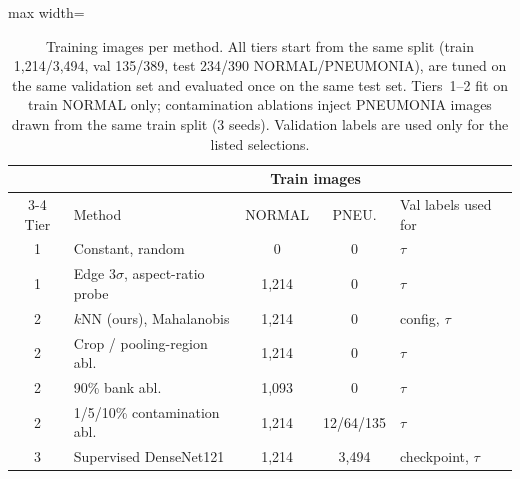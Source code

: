 \begin{table}[t]
\centering
\footnotesize
\setlength{\tabcolsep}{3.5pt}
\begin{adjustbox}{max width=\columnwidth}
\begin{tabular}{clccl}
\toprule
 & & \multicolumn{2}{c}{Train images} & \\
\cmidrule(lr){3-4}
Tier & Method & NORMAL & PNEU. & Val labels used for \\
\midrule
1 & Constant, random & 0 & 0 & $\tau$ \\
1 & Edge $3\sigma$, aspect-ratio probe & 1,214 & 0 & $\tau$ \\
2 & $k$NN (ours), Mahalanobis & 1,214 & 0 & config, $\tau$ \\
2 & Crop / pooling-region abl. & 1,214 & 0 & $\tau$ \\
2 & 90\% bank abl. & 1,093 & 0 & $\tau$ \\
2 & 1/5/10\% contamination abl. & 1,214 & 12/64/135 & $\tau$ \\
3 & Supervised DenseNet121 & 1,214 & 3,494 & checkpoint, $\tau$ \\
\bottomrule
\end{tabular}
\end{adjustbox}
\caption{Training images per method. All tiers start from the same split (train 1,214/3,494, val 135/389, test 234/390 NORMAL/PNEUMONIA), are tuned on the same validation set and evaluated once on the same test set. Tiers~1--2 fit on train NORMAL only; contamination ablations inject PNEUMONIA images drawn from the same train split (3 seeds). Validation labels are used only for the listed selections.}
\label{tab:train-counts}
\end{table}
